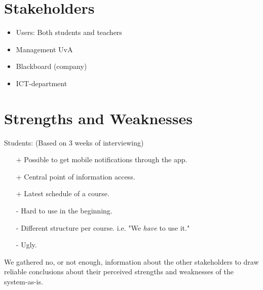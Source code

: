 \section{Stakeholders}
\begin{itemize}
	\item Users: Both students and teachers
	\item Management UvA
	\item Blackboard (company)
	\item ICT-department
\end{itemize}

\section{Strengths and Weaknesses}
Students: (Based on 3 weeks of interviewing)
\begin{itemize}
	\item[+] Possible to get mobile notifications through the app.
    \item[+] Central point of information access.
	\item[+] Latest schedule of a course.
	\item[-] Hard to use in the beginning.
	\item[-] Different structure per course.
  i.e. "We \textit{have} to use it."
	\item[-] Ugly.
\end{itemize}

We gathered no, or not enough, information about the other stakeholders to draw reliable conclusions about their perceived strengths and weaknesses of the system-as-is.
                               
